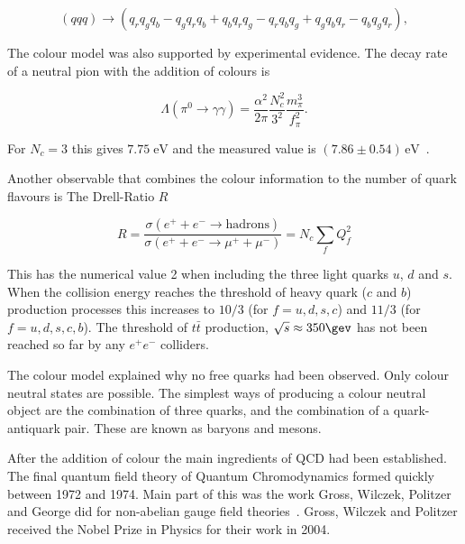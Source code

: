 \begin{equation}
\left( qqq\right)\rightarrow\left(q_rq_gq_b-q_gq_rq_b+q_bq_rq_g-q_rq_bq_g+q_gq_bq_r-q_bq_gq_r\right),
\end{equation}

\noindent The colour model was also supported by experimental evidence. The decay rate of a neutral pion with the addition of colours is

\begin{equation}
\Lambda\left(\pi^0\rightarrow\gamma \gamma\right) = \frac{\alpha^2}{2\pi}\frac{N_c^2}{3^2}\frac{m_\pi^3}{f_\pi^2}.
\end{equation} 

For $N_c=3$ this gives $7.75 \;\mathrm{eV}$ and the measured value is $(7.86\pm0.54)\,\mathrm{eV}$~\cite{Williams:1988sg}.

Another observable that combines the colour information to the number of quark flavours is The Drell-Ratio $R$~\cite{Krolikowski:1974jx}

\begin{equation}
R=\frac{\sigma\left(e^++e^-\rightarrow\mathrm{hadrons}\right)}{\sigma\left(e^++e^-\rightarrow\mu^++\mu^-\right)}=N_c\sum_fQ_f^2
\end{equation}

This has the numerical value 2 when including the three light quarks $u$, $d$ and $s$. When the collision energy reaches the threshold of heavy quark ($c$ and $b$) production processes this increases to $10/3$ (for $f=u,d,s,c$) and $11/3$ (for $f=u,d,s,c,b$). The threshold of $t\bar t$ production, $\sqrt{s}\approx350\gev$ has not been reached so far by any $e^+e^-$ colliders.

The colour model explained why no free quarks had been observed. Only colour neutral states are possible. The simplest ways of producing a colour neutral object are the combination of three quarks, and the combination of a quark-antiquark pair. These are known as baryons and mesons.

After the addition of colour the main ingredients of QCD had been established. The final quantum field theory of Quantum Chromodynamics formed quickly between 1972 and 1974. Main part of this was the work Gross, Wilczek, Politzer and George did for non-abelian gauge field theories~\cite{gross1973ultraviolet, politzer1973reliable, gross1973asymptotically, gross1974asymptotically, georgi1974electroproduction}. Gross, Wilczek and Politzer received the Nobel Prize in Physics for their work in 2004.

